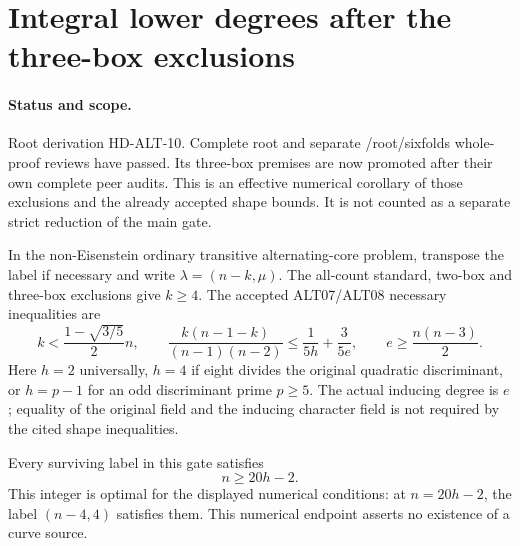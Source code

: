 \section{Integral lower degrees after the three-box exclusions}
\label{sec:alternating-four-tail-integral-cutoffs}

\paragraph{Status and scope.}
Root derivation HD-ALT-10. Complete root and separate
/root/sixfolds whole-proof reviews have passed. Its three-box
premises are now promoted after their own complete peer audits. This is an effective numerical
corollary of those exclusions and the already accepted shape bounds.
It is not counted as a separate strict reduction of the main gate.

In the non-Eisenstein ordinary transitive alternating-core problem,
transpose the label if necessary and write $\lambda=(n-k,\mu)$.
The all-count standard, two-box and three-box exclusions give $k\ge4$.
The accepted ALT07/ALT08 necessary inequalities are
\[
 k<\frac{1-\sqrt{3/5}}2n,\qquad
 \frac{k(n-1-k)}{(n-1)(n-2)}
       \le\frac1{5h}+\frac3{5e},\qquad
 e\ge\frac{n(n-3)}2.                                  \tag{ALT10.1}
\]
Here $h=2$ universally, $h=4$ if eight divides the original
quadratic discriminant, or $h=p-1$ for an odd discriminant
prime $p\ge5$. The actual inducing degree is $e$; equality
of the original field and the inducing character field is
not required by the cited shape inequalities.

\begin{corollary}[HD-ALT-10]
Every surviving label in this gate satisfies
\[
                              n\ge20h-2.                \tag{ALT10.2}
\]
This integer is optimal for the displayed numerical conditions:
at $n=20h-2$, the label $(n-4,4)$ satisfies them. This
numerical endpoint asserts no existence of a curve source.
\end{corollary}

